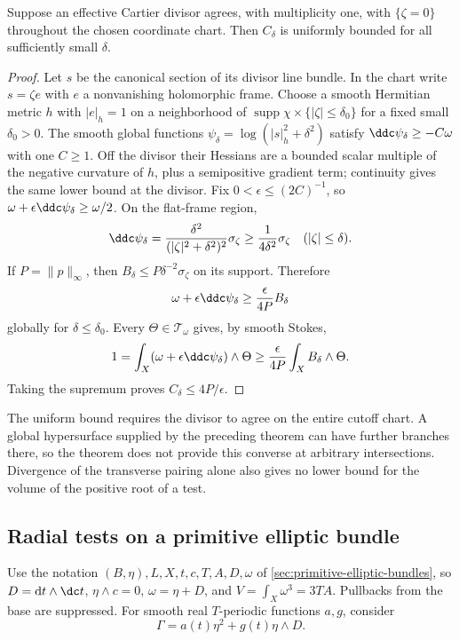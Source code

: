 \begin{proposition}\label{draft:597-cartier-concentration-bound}
Suppose an effective Cartier divisor agrees, with multiplicity one, with $\{\zeta=0\}$ throughout the chosen coordinate chart. Then $C_\delta$ is uniformly bounded for all sufficiently small $\delta$.
\end{proposition}
\begin{proof}
Let $s$ be the canonical section of its divisor line bundle. In the chart write $s=\zeta e$ with $e$ a nonvanishing holomorphic frame. Choose a smooth Hermitian metric $h$ with $|e|_h=1$ on a neighborhood of $\operatorname{supp}\chi\times\{|\zeta|\leq\delta_0\}$ for a fixed small $\delta_0>0$.
The smooth global functions $\psi_\delta=\log(|s|_h^2+\delta^2)$ satisfy $\ddc\psi_\delta\geq-C\omega$ with one $C\geq1$. Off the divisor their Hessians are a bounded scalar multiple of the negative curvature of $h$, plus a semipositive gradient term; continuity gives the same lower bound at the divisor. Fix $0<\epsilon\leq(2C)^{-1}$, so $\omega+\epsilon\ddc\psi_\delta\geq\omega/2$.
On the flat-frame region,
\[
 \ddc\psi_\delta
 =\frac{\delta^2}{(|\zeta|^2+\delta^2)^2}\sigma_\zeta
 \geq\frac1{4\delta^2}\sigma_\zeta
 \quad(|\zeta|\leq\delta).
\]
If $P=\|p\|_\infty$, then $B_\delta\leq P\delta^{-2}\sigma_\zeta$ on its support. Therefore
\[
 \omega+\epsilon\ddc\psi_\delta\geq\frac{\epsilon}{4P}B_\delta
\]
globally for $\delta\leq\delta_0$. Every $\Theta\in\mathcal T_\omega$ gives, by smooth Stokes,
\[
 1=\int_X(\omega+\epsilon\ddc\psi_\delta)\wedge\Theta
      \geq\frac{\epsilon}{4P}\int_XB_\delta\wedge\Theta.
\]
Taking the supremum proves $C_\delta\leq4P/\epsilon$.
\end{proof}

The uniform bound requires the divisor to agree on the entire cutoff chart. A global hypersurface supplied by the preceding theorem can have further branches there, so the theorem does not provide this converse at arbitrary intersections. Divergence of the transverse pairing alone also gives no lower bound for the volume of the positive root of a test.

\subsection{Radial tests on a primitive elliptic bundle}

Use the notation $(B,\eta),L,X,t,c,T,A,D,\omega$ of \cref{sec:primitive-elliptic-bundles}, so $D=\mathrm dt\wedge\dc t$, $\eta\wedge c=0$, $\omega=\eta+D$, and $V=\int_X\omega^3=3TA$. Pullbacks from the base are suppressed. For smooth real $T$-periodic functions $a,g$, consider
\[
 \Gamma=a(t)\eta^2+g(t)\eta\wedge D.
\]


